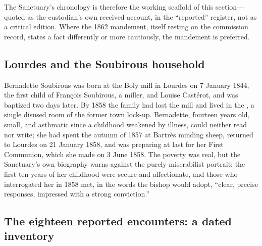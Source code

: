 The Sanctuary's chronology is therefore the working scaffold of
this section---quoted as the custodian's own received account, in
the ``reported'' register, not as a critical edition. Where the
1862 mandement, itself resting on the commission record, states a
fact differently or more cautiously, the mandement is preferred.

\subsection{Lourdes and the Soubirous household}

Bernadette Soubirous was born at the Boly mill in Lourdes on 7
January 1844, the first child of Fran\c{c}ois Soubirous, a miller,
and Louise Cast\'erot, and was baptized two days later. By 1858 the
family had lost the mill and lived in the , a single
disused room of the former town lock-up. Bernadette, fourteen years
old, small, and asthmatic since a childhood weakened by illness,
could neither read nor write; she had spent the autumn of 1857 at
Bartr\`es minding sheep, returned to Lourdes on 21 January 1858,
and was preparing at last for her First Communion, which she made
on 3 June 1858. The poverty was real, but the Sanctuary's own biography
warns against the purely miserabilist portrait: the first ten years
of her childhood were secure and affectionate, and those who
interrogated her in 1858 met, in the words the bishop would adopt,
``clear, precise responses, impressed with a strong
conviction.''

\subsection{The eighteen reported encounters: a dated inventory}

